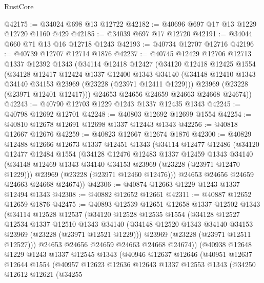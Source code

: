 \begin{lexlean}{RustCore}
\begin{coremodule}
@42175 := @34024 @698 @13 @12722
@42182 := @40696 @697 @17 @13 @1229 @12720 @1160 @429
@42185 := @34039 @697 @17 @12720
@42191 := @34044 @660 @71 @13 @16 @12718 @1243
@42193 := @40734 @12707 @12716
@42196 := @40739 @12707 @12714 @1876
@42237 := @40745
    @12429
    @12706
    @12713
    @1337
    @12392
    @1343
    (@34114
      @12418
      @12427
      (@34120
        @12418
        @12425
        @1554
        (@34128
          @12417
          @12424
          @1337
          @12400
          @1343
          @34140
          (@34148 @12410 @1343 @34140 @34153 @23969 (@23228 (@23971 @12411 @1229)))
          @23969
          (@23228 (@23971 @12401 @12417)))
        @24653
        @24656
        @24659
        @24663
        @24668
        @24674))
@42243 := @40790 @12703 @1229 @1243 @1337 @12435 @1343
@42245 := @40798 @12692 @12701
@42248 := @40803 @12692 @12699 @1554
@42254 := @40810 @12678 @12691 @12698 @1337 @12443 @1343
@42256 := @40818 @12667 @12676
@42259 := @40823 @12667 @12674 @1876
@42300 := @40829
    @12488
    @12666
    @12673
    @1337
    @12451
    @1343
    (@34114
      @12477
      @12486
      (@34120
        @12477
        @12484
        @1554
        (@34128
          @12476
          @12483
          @1337
          @12459
          @1343
          @34140
          (@34148 @12469 @1343 @34140 @34153 @23969 (@23228 (@23971 @12470 @1229)))
          @23969
          (@23228 (@23971 @12460 @12476)))
        @24653
        @24656
        @24659
        @24663
        @24668
        @24674))
@42306 := @40874 @12663 @1229 @1243 @1337 @12494 @1343
@42308 := @40882 @12652 @12661
@42311 := @40887 @12652 @12659 @1876
@42475 := @40893
    @12539
    @12651
    @12658
    @1337
    @12502
    @1343
    (@34114
      @12528
      @12537
      (@34120
        @12528
        @12535
        @1554
        (@34128
          @12527
          @12534
          @1337
          @12510
          @1343
          @34140
          (@34148 @12520 @1343 @34140 @34153 @23969 (@23228 (@23971 @12521 @1229)))
          @23969
          (@23228 (@23971 @12511 @12527)))
        @24653
        @24656
        @24659
        @24663
        @24668
        @24674))
    (@40938
      @12648
      @1229
      @1243
      @1337
      @12545
      @1343
      (@40946
        @12637
        @12646
        (@40951
          @12637
          @12644
          @1554
          (@40957
            @12623
            @12636
            @12643
            @1337
            @12553
            @1343
            (@34250
              @12612
              @12621
              (@34255

\end{coremodule}
\end{lexlean}
